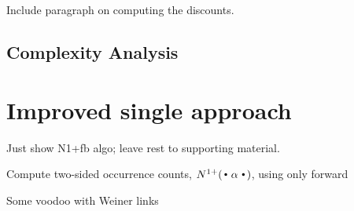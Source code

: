 Include paragraph on computing the discounts.


\subsection{Complexity Analysis}

\section{Improved single \CST approach}

Just show N1+fb algo; leave rest to supporting material.

\begin{algorithm}
  \caption{Compute two-sided occurrence counts, $\nlplus{\dotpatdot}$, using only forward \CST 
    \label{alg:n1plusfb_wt}}
  \begin{algorithmic}[1]
        \If{$\depth{\tf}{\nf} > |\alpha|$}   
        \Else
              \State Some voodoo with Weiner links
            \EndFor
          \EndIf
      \State {}
    \EndFunction
  \end{algorithmic}
\end{algorithm}


